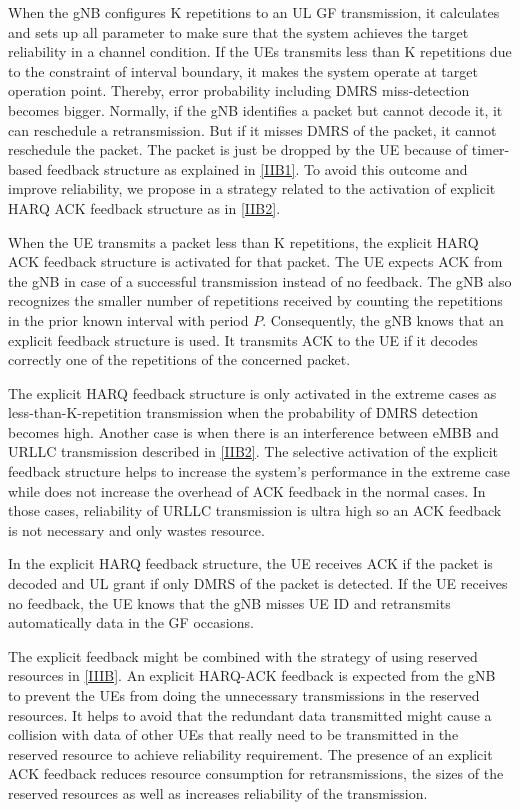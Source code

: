 \documentclass{ieeeaccess}
\begin{document}
When the gNB configures K repetitions to an UL GF transmission, it calculates and sets up all parameter to make sure that the system achieves the target reliability in a channel condition. If the UEs transmits less than K repetitions due to the constraint of interval boundary, it makes the system operate at target operation point. Thereby, error probability including DMRS miss-detection becomes bigger. Normally, if the gNB identifies a packet but cannot decode it, it can reschedule a retransmission. But if it misses DMRS of the packet, it cannot reschedule the packet. The packet is just be dropped by the UE because of timer-based feedback structure as explained in \ref{IIB1}. To avoid this outcome and improve reliability,  we propose in \cite{ad100} a strategy related to the activation of explicit HARQ ACK feedback structure as in \ref{IIB2}.

When the UE transmits a packet less than K repetitions, the explicit HARQ ACK feedback structure is activated for that packet. The UE expects ACK from the gNB in case of a successful transmission instead of no feedback. The gNB also recognizes the smaller number of repetitions received by counting the repetitions in the prior known interval with period $P$. Consequently, the gNB knows that an explicit feedback structure is used. It transmits ACK to the UE if it decodes correctly one of the repetitions of the concerned packet.

The explicit HARQ feedback structure is only activated in the extreme cases as less-than-K-repetition transmission when the probability of DMRS detection becomes high. Another case is when there is an interference between eMBB and URLLC transmission described in \ref{IIB2}. The selective activation of the explicit feedback structure helps to increase the system's performance in the extreme case while does not increase the overhead of ACK feedback in the normal cases. In those cases, reliability of URLLC transmission is ultra high so an ACK feedback is not necessary and only wastes resource.

In the explicit HARQ feedback structure, the UE receives ACK if the packet is decoded and UL grant if only DMRS of the packet is detected. If the UE receives no feedback, the UE knows that the gNB misses UE ID and retransmits automatically data in the GF occasions.

The explicit feedback might be combined with the strategy of using reserved resources in \ref{IIIB}. An explicit HARQ-ACK feedback is expected from the gNB to prevent the UEs from doing the unnecessary transmissions in the reserved resources. It helps to avoid that the redundant data transmitted might cause a collision with data of other UEs that really need to be transmitted in the reserved resource to achieve reliability requirement. The presence of an explicit ACK feedback reduces resource consumption for retransmissions, the sizes of the reserved resources as well as increases reliability of the transmission. 
\end{document}
